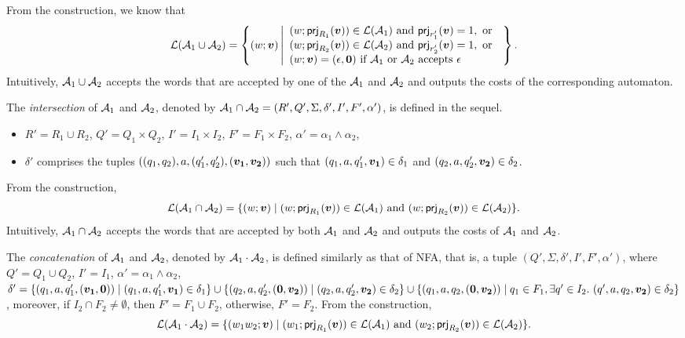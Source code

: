 From the construction, we know that 
$$
\Lang(\aut_1 \cup \aut_2) = 
\left\{(w; \myvec{v}) \left \vert 
\begin{array}{l}
(w; \prj_{R_1}(\myvec{v})) \in \Lang(\aut_1) \mbox{ and } \prj_{r_1'}(\myvec{v}) = 1, \mbox{ or } \\
(w; \prj_{R_2}(\myvec{v})) \in \Lang(\aut_2) \mbox{ and } \prj_{r_2'}(\myvec{v}) = 1, \mbox{ or } \\
(w; \myvec{v}) = (\epsilon, \myvec{0}) \mbox{ if } \aut_1 \mbox{ or } \aut_2 \mbox{ accepts } \epsilon
\end{array}
\right.
\right\}.
$$ 
Intuitively, $\mathcal{A}_1 \cup \mathcal{A}_2$ accepts the words that are accepted by one of the $\mathcal{A}_1$ and $\mathcal{A}_2$ and outputs the costs of the corresponding automaton.

The \emph{intersection} of $\mathcal{A}_1$ and $\mathcal{A}_2$, denoted by $\mathcal{A}_1 \cap \mathcal{A}_2 = (R', Q', \Sigma, \delta', I', F', \alpha')$, is defined in the sequel. 
\vspace{-0.5mm}
\begin{itemize}
\item $R' = R_1 \cup R_2$, $Q' = Q_1 \times Q_2$, $I' = I_1 \times I_2$, $F' = F_1 \times F_2$, $\alpha' = \alpha_1 \wedge \alpha_2$, 
%
%
\item $\delta'$ comprises the tuples $((q_1, q_2), a, (q'_1, q'_2), (\myvec{v_1}, \myvec{v_2}))$ such that $(q_1,a, q'_1, \myvec{v_1}) \in \delta_1$ and $(q_2,a, q'_2, \myvec{v_2}) \in \delta_2$.
\end{itemize}
\vspace{-0.5mm}
From the construction, 
\vspace{-0.5mm}
$$\Lang(\aut_1 \cap \aut_2) = \{(w; \myvec{v}) \mid (w; \prj_{R_1}(\myvec{v})) \in \Lang(\aut_1) \mbox{ and } (w; \prj_{R_2}(\myvec{v})) \in \Lang(\aut_2)\}.$$
\vspace{-0.5mm}
Intuitively, $\mathcal{A}_1 \cap \mathcal{A}_2$ accepts the words that are accepted by both $\mathcal{A}_1$ and $\mathcal{A}_2$ and outputs the costs of $\mathcal{A}_1$ and $\mathcal{A}_2$.  

The \emph{concatenation} of $\mathcal{A}_1$ and $\mathcal{A}_2$, denoted by $\mathcal{A}_1 \cdot \mathcal{A}_2$, is defined similarly as that of NFA, that is, a tuple $(Q', \Sigma, \delta', I', F', \alpha')$, where $Q' = Q_1 \cup Q_2$, $I' = I_1$, $\alpha' = \alpha_1 \wedge \alpha_2$, $\delta' = \{(q_1, a, q'_1, (\myvec{v_1}, \myvec{0})) \mid (q_1, a, q'_1, \myvec{v_1}) \in \delta_1\} \cup \{(q_2, a, q'_2, (\myvec{0}, \myvec{v_2})) \mid (q_2, a, q'_2, \myvec{v_2}) \in \delta_2\} \cup \{(q_1, a, q_2, (\myvec{0}, \vec{v_2})) \mid q_1 \in F_1, \exists q' \in I_2.\ (q', a, q_2, \vec{v_2}) \in \delta_2\}$, moreover, if $I_2 \cap F_2 \neq \emptyset$, then $F'= F_1 \cup F_2$, otherwise, $F'= F_2$. From the construction, 
$$\Lang(\aut_1 \concat \aut_2) = \{(w_1w_2; \myvec{v}) \mid (w_1; \prj_{R_1}(\myvec{v})) \in \Lang(\aut_1) \mbox{ and }(w_2; \prj_{R_2}(\myvec{v})) \in \Lang(\aut_2)\}.$$

